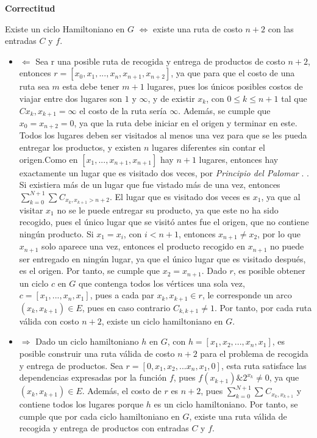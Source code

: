 \documentclass[twocolumn, fontsize=10pt]{article}
\theoremstyle{definition} %
\begin{document}
\textbf{Correctitud}

Existe un ciclo Hamiltoniano en \( G \)  \(\iff\) existe una ruta de costo \(n+2\) con las entradas \(C\) y \(f\).

\begin{itemize}
    \item \(\Leftarrow\) 
    Sea r una posible ruta de recogida y entrega de productos de costo \(n+2\), entonces \(r = [x_0,x_1,...,x_n,x_{n+1},x_{n+2}]\), ya que para que el costo de una ruta sea \(m\) esta debe tener \(m+1\) lugares, pues los únicos posibles costos de viajar entre dos lugares son \(1\) y \(\infty\), y de existir \(x_k\), con \(0 \leq k \leq n+1\) tal que \(C{x_k,x_{k+1}} = \infty\)  el costo de la ruta sería \(\infty\). Además, se cumple que \(x_0=x_{n+2}=0\), ya que la ruta debe iniciar en el origen y terminar en este. Todos los lugares deben ser visitados al menos una vez para que se les pueda entregar los productos, y existen \(n\) lugares diferentes sin contar el origen.Como en \([x_1,...,x_{n+1},x_{n+1}]\) hay \(n+1\) lugares, entonces hay exactamente un lugar que es visitado dos veces, por \textit{Principio del Palomar} \cite{palomar}.     
    \). Si existiera más de un lugar que fue vistado más de una vez, entonces 
    \(\sum_{k=0}^{N+1} \sum_{} C_{x_k, x_{k+1} > n+2}\). El lugar que es visitado dos veces es \(x_1\), ya que al visitar \(x_1\) no se le puede entregar su producto, ya que este no ha sido recogido, pues el único lugar que se visitó antes fue el origen, que no contiene ningún producto. Si \(x_1 = x_i\), con \(i<n+1\), entonces \(x_{n+1} \neq x_2\), por lo que \(x_{n+1}\) solo aparece una vez, entonces el producto recogido en \(x_{n+1}\) no puede ser entregado en ningún lugar, ya que el único lugar que es visitado después, es el origen. Por tanto, se cumple que \(x_2 = x_{n+1}\). Dado \(r\), es posible obtener un ciclo \(c\) en \(G\) que contenga todos los vértices una sola vez, \(c = [x_1,...,x_n,x_1]\), pues a cada par \(x_k,x_{k+1} \in r\), le corresponde un arco \((x_k,x_{k+1}) \in E\), pues en caso contrario \(C_{k,k+1} \neq 1\). Por tanto, por cada ruta válida con costo \(n+2\), existe un ciclo hamiltoniano en \(G\).

    \item \(\Rightarrow\) 
    Dado un ciclo hamiltoniano \(h\) en \(G\), con \(h=[x_1,x_2,...,x_n,x_1]\), es posible construir una ruta válida de costo \(n+2\) para el problema de recogida y entrega de productos. Sea \(r=[0,x_1,x_2,...x_n,x_1,0]\), esta ruta satisface las dependencias expresadas por la función \(f\), pues  \(f(x_{k+1}) \& 2^{x_k} \neq 0\), ya que \((x_k,x_{k+1})\in E\). Además, el costo de \(r\) es \(n+2\), pues \(\sum_{k=0}^{N+1} \sum_{} C_{x_k, x_{k+1}}\) y contiene todos los lugares porque \(h\) es un ciclo hamiltoniano. Por tanto, se cumple que por cada ciclo hamiltoniano en \(G\), existe una ruta válida de recogida y entrega de productos con entradas \(C\) y \(f\).
 
    

\end{itemize}
\end{document}
